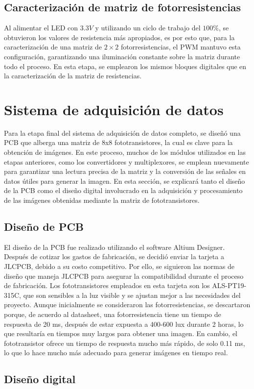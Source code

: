 \subsection{Caracterización de matriz de fotorresistencias}
Al alimentar el LED con $3.3V$ y utilizando un ciclo de trabajo del $100\%$, se obtuvieron los valores de resistencia más apropiados, es por esto que, para la caracterización de una matriz de $2\times2$ fotorresistencias, el PWM mantuvo esta configuración, garantizando una iluminación constante sobre la matriz durante todo el proceso. En esta etapa, se emplearon los mismos bloques digitales que en la caracterización de la matriz de resistencias.

\section{Sistema de adquisición de datos}
Para la etapa final del sistema de adquisición de datos completo, se diseñó una PCB que alberga una matriz de 8x8 fototransistores, la cual es clave para la obtención de imágenes. En este proceso, muchos de los módulos utilizados en las etapas anteriores, como los convertidores y multiplexores, se emplean nuevamente para garantizar una lectura precisa de la matriz y la conversión de las señales en datos útiles para generar la imagen. En esta sección, se explicará tanto el diseño de la PCB como el diseño digital involucrado en la adquisición y procesamiento de las imágenes obtenidas mediante la matriz de fototransistores.

\subsection{Diseño de PCB}
El diseño de la PCB fue realizado utilizando el software Altium Designer. Después de cotizar los gastos de fabricación, se decidió enviar la tarjeta a JLCPCB, debido a su costo competitivo. Por ello, se siguieron las normas de diseño que maneja JLCPCB para asegurar la compatibilidad durante el proceso de fabricación. Los fototransistores empleados en esta tarjeta son los ALS-PT19-315C, que son sensibles a la luz visible y se ajustan mejor a las necesidades del proyecto. Aunque inicialmente se consideraron las fotorresistencias, se descartaron porque, de acuerdo al datasheet, una fotorresistencia tiene un tiempo de respuesta de 20 ms, después de estar expuesta a 400-600 lux durante 2 horas, lo que resultaría en tiempos muy largos para obtener una imagen. En cambio, el fototransistor ofrece un tiempo de respuesta mucho más rápido, de solo 0.11 ms, lo que lo hace mucho más adecuado para generar imágenes en tiempo real.

\subsection{Diseño digital}


